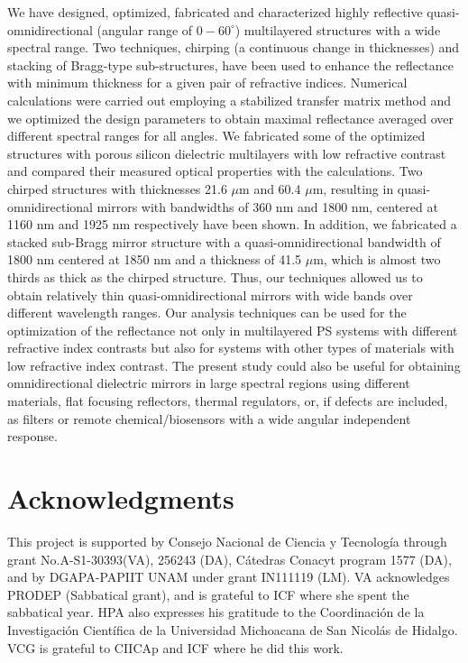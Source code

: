 \documentclass[a4paper,fleqn]{cas-sc}
\begin{document}
We have designed, optimized, fabricated and characterized highly
reflective quasi-omnidirectional (angular range of $0-60^\circ$)
multilayered structures with a wide
spectral range. Two techniques, chirping (a continuous change in thicknesses) and
stacking of Bragg-type sub-structures, have been used to enhance the
reflectance with minimum thickness for a given pair of refractive
indices. Numerical calculations were
carried out employing a stabilized transfer matrix method and we optimized the
design parameters to obtain maximal reflectance averaged over different spectral ranges for
all angles.
We fabricated some of the optimized structures with
porous silicon
dielectric multilayers with low refractive contrast and compared their measured  optical properties
with the calculations. Two chirped structures
with thicknesses 21.6 $\mu$m and 60.4 $\mu$m,
resulting in quasi-omnidirectional mirrors with bandwidths of 360 nm and 1800 nm, centered
at 1160 nm and 1925 nm respectively have been shown. In addition,
we fabricated a stacked sub-Bragg mirror structure  with a
quasi-omnidirectional bandwidth of 1800 nm centered at 1850 nm and a
thickness of 41.5 $\mu$m, which is almost two thirds as thick as the chirped structure.
Thus, our techniques allowed us to obtain relatively thin
quasi-omnidirectional mirrors with wide bands
over different wavelength ranges.
Our analysis techniques can
be used for the optimization of the reflectance not only in multilayered PS systems with
different refractive index contrasts but also for systems with other types of
materials with low refractive index contrast. The present study could
also be useful for obtaining omnidirectional dielectric mirrors in
large spectral regions using different materials,  flat focusing
reflectors, thermal regulators, or, if
defects are included, as filters or remote chemical/biosensors with
a wide angular independent response.


\section*{Acknowledgments}

This project is supported by Consejo Nacional de Ciencia y
Tecnolog\'{i}a through grant No.A-S1-30393(VA), 256243 (DA), C\'{a}tedras
Conacyt program 1577 (DA), and by DGAPA-PAPIIT UNAM under grant IN111119 (LM).
VA acknowledges PRODEP (Sabbatical grant), and
is grateful to ICF where she spent the sabbatical year.
HPA also expresses his gratitude to the Coordinaci\'{o}n
de la Investigaci\'{o}n Cient\'{i}fica de la Universidad
Michoacana de San Nicol\'{a}s de Hidalgo. VCG is grateful to CIICAp
and ICF where he did this work.

\printcredits



\end{document}
